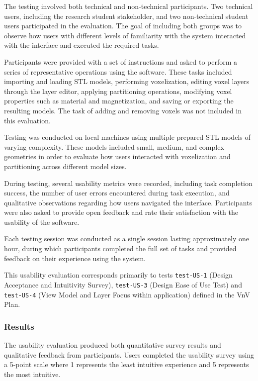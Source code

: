 \documentclass[12pt, titlepage]{article}
\begin{document}
The testing involved both technical and non-technical participants. Two technical users, including the research student stakeholder, and two non-technical student users participated in the evaluation. The goal of including both groups was to observe how users with different levels of familiarity with the system interacted with the interface and executed the required tasks.

Participants were provided with a set of instructions and asked to perform a series of representative operations using the software. These tasks included importing and loading STL models, performing voxelization, editing voxel layers through the layer editor, applying partitioning operations, modifying voxel properties such as material and magnetization, and saving or exporting the resulting models. The task of adding and removing voxels was not included in this evaluation.

Testing was conducted on local machines using multiple prepared STL models of varying complexity. These models included small, medium, and complex geometries in order to evaluate how users interacted with voxelization and partitioning across different model sizes.

During testing, several usability metrics were recorded, including task completion success, the number of user errors encountered during task execution, and qualitative observations regarding how users navigated the interface. Participants were also asked to provide open feedback and rate their satisfaction with the usability of the software.

Each testing session was conducted as a single session lasting approximately one hour, during which participants completed the full set of tasks and provided feedback on their experience using the system.

This usability evaluation corresponds primarily to tests \texttt{test-US-1} (Design Acceptance and Intuitivity Survey), \texttt{test-US-3} (Design Ease of Use Test) and \texttt{test-US-4} (View Model and Layer Focus within application) defined in the VnV Plan.
\subsubsection{Results}

The usability evaluation produced both quantitative survey results and qualitative feedback from participants. Users completed the usability survey using a 5-point scale where 1 represents the least intuitive experience and 5 represents the most intuitive.
\end{document}
